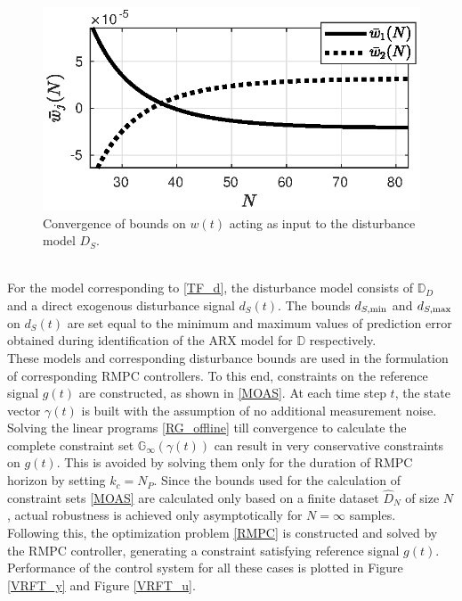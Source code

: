 \documentclass[letterpaper, 10 pt, conference]{ieeeconf}  %
\begin{document}
	\begin{figure}[h]
		\hspace{10pt}
		\includegraphics[scale = 0.70]{bounds_RG.eps}
		\caption{Convergence of bounds on $w(t)$ acting as input to the disturbance model $D_S$.}
		\label{bounds_RG}
	\end{figure} \\
	For the model corresponding to \eqref{TF_d}, the disturbance model consists of $\mathbb{D}_D$ and a direct exogenous disturbance signal $d_S(t)$. The bounds $d_{S,{\rm min}}$ and $d_{S,{\rm max}}$ on $d_S(t)$ are set equal to the minimum and maximum values of prediction error obtained during identification of the ARX model for $\mathbb{D}$ respectively. \\
	These models and corresponding disturbance bounds are used in the formulation of corresponding RMPC controllers. To this end, constraints on the reference signal $g(t)$ are constructed, as shown in \eqref{MOAS}. At each time step $t$, the state vector $\gamma(t)$ is built with the assumption of no additional measurement noise. Solving the linear programs \eqref{RG_offline} till convergence to calculate the complete constraint set $\mathbb{G}_{\infty}(\gamma(t))$ can result in very conservative constraints on $g(t)$. This is avoided by solving them only for the duration of RMPC horizon by setting $k_c = N_P$. Since the bounds used for the calculation of constraint sets \eqref{MOAS} are calculated only based on a finite dataset $\hat{D}_{N}$ of size $N$, actual robustness is achieved only asymptotically for $N=\infty$ samples.\\
	Following this,
	the optimization problem \eqref{RMPC} is constructed and solved by the RMPC controller, generating a constraint satisfying reference signal $g(t)$.
	Performance of the control system for all these cases is plotted in Figure \ref{VRFT_y} and Figure \ref{VRFT_u}.
\end{document}
